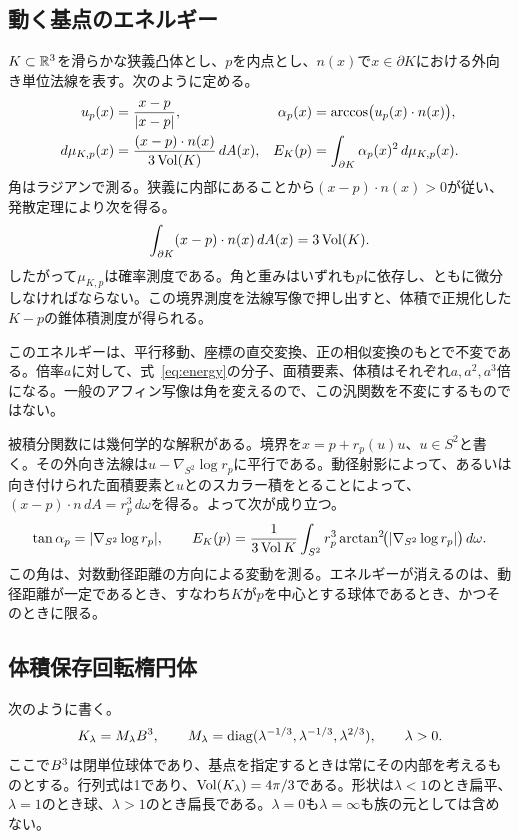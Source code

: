 \subsection{動く基点のエネルギー}
$K\subset\mathbb R^3$を滑らかな狭義凸体とし、$p$を内点とし、$n(x)$で$x\in\partial K$における外向き単位法線を表す。次のように定める。
\begin{align}
 u_p(x)&=\frac{x-p}{|x-p|},&
 \alpha_p(x)&=\arccos\bigl(u_p(x)\cdot n(x)\bigr),\label{eq:angle}\\
 d\mu_{K,p}(x)&=\frac{(x-p)\cdot n(x)}{3\operatorname{Vol}(K)}\,dA(x),&
 E_K(p)&=\int_{\partial K}\alpha_p(x)^2\,d\mu_{K,p}(x).\label{eq:energy}
\end{align}
角はラジアンで測る。狭義に内部にあることから$(x-p)\cdot n(x)>0$が従い、発散定理により次を得る。
\[
 \int_{\partial K}(x-p)\cdot n(x)\,dA(x)=3\operatorname{Vol}(K).
\]
したがって$\mu_{K,p}$は確率測度である。角と重みはいずれも$p$に依存し、ともに微分しなければならない。この境界測度を法線写像で押し出すと、体積で正規化した$K-p$の錐体積測度が得られる\citep{Boroczky2013,Huang2016}。

このエネルギーは、平行移動、座標の直交変換、正の相似変換のもとで不変である。倍率$a$に対して、式~\eqref{eq:energy}の分子、面積要素、体積はそれぞれ$a,a^2,a^3$倍になる。一般のアフィン写像は角を変えるので、この汎関数を不変にするものではない。

被積分関数には幾何学的な解釈がある。境界を$x=p+r_p(u)u$、$u\in S^2$と書く。その外向き法線は$u-\nabla_{S^2}\log r_p$に平行である。動径射影によって、あるいは向き付けられた面積要素と$u$とのスカラー積をとることによって、$(x-p)\cdot n\,dA=r_p^3\,d\omega$を得る。よって次が成り立つ。
\[
 \tan\alpha_p=|\nabla_{S^2}\log r_p|,\qquad
 E_K(p)=\frac{1}{3\operatorname{Vol} K}\int_{S^2}r_p^3
 \arctan^2\!\bigl(|\nabla_{S^2}\log r_p|\bigr)\,d\omega .
\]
この角は、対数動径距離の方向による変動を測る。エネルギーが消えるのは、動径距離が一定であるとき、すなわち$K$が$p$を中心とする球体であるとき、かつそのときに限る。

\subsection{体積保存回転楕円体}
次のように書く。
\begin{equation}\label{eq:family}
 K_\lambda=M_\lambda B^3,\qquad
 M_\lambda=\operatorname{diag}(\lambda^{-1/3},\lambda^{-1/3},\lambda^{2/3}),\qquad\lambda>0.
\end{equation}
ここで$B^3$は閉単位球体であり、基点を指定するときは常にその内部を考えるものとする。行列式は1であり、$\operatorname{Vol}(K_\lambda)=4\pi/3$である。形状は$\lambda<1$のとき扁平、$\lambda=1$のとき球、$\lambda>1$のとき扁長である。$\lambda=0$も$\lambda=\infty$も族の元としては含めない。

